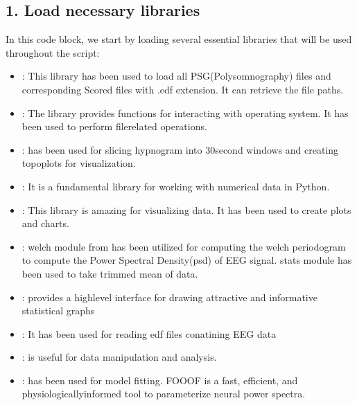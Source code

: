 \documentclass[letterpaper,10pt,english]{sphinxmanual}
\begin{document}
\subsection{1. Load necessary libraries}
\label{\detokenize{code:load-necessary-libraries}}
\sphinxAtStartPar
In this code block, we start by loading several essential libraries that will be used throughout the script:
\begin{itemize}
\item {} 
\sphinxAtStartPar
{}: This library has been used to load all PSG(Polysomnography) files and corresponding Scored files with .edf extension. It can retrieve the file paths.

\item {} 
\sphinxAtStartPar
{}: The  library provides functions for interacting with operating system. It has been used to perform file\sphinxhyphen{}related operations.

\item {} 
\sphinxAtStartPar
{}:  has been used for slicing hypnogram into 30\sphinxhyphen{}second windows and creating topoplots for visualization.

\item {} 
\sphinxAtStartPar
{}: It is a fundamental library for working with numerical data in Python.

\item {} 
\sphinxAtStartPar
{}: This library is amazing for visualizing data. It has been used to create plots and charts.

\item {} 
\sphinxAtStartPar
{} : welch module from  has been utilized for computing the welch periodogram to compute the Power Spectral Density(psd) of EEG signal. stats module has been used to take trimmed mean of data.

\item {} 
\sphinxAtStartPar
{}:  provides a high\sphinxhyphen{}level interface for drawing attractive and informative statistical graphs

\item {} 
\sphinxAtStartPar
{}: It has been used for reading edf files conatining EEG data

\item {} 
\sphinxAtStartPar
{}:  is useful for data manipulation and analysis.

\item {} 
\sphinxAtStartPar
{}:  has been used for model fitting. FOOOF is a fast, efficient, and physiologically\sphinxhyphen{}informed tool to parameterize neural power spectra.

\end{itemize}
\end{document}
